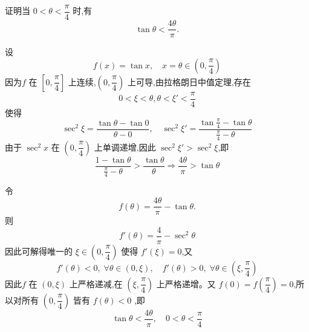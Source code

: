 \begin{questions}
    \question 证明当 $0 < \theta < \dfrac{\pi}{4}$ 时,有
    \[
    \tan \theta < \frac{4\theta}{\pi}.
    \]
    \begin{solution}
        设 
        \[
        f(x) = \tan x,\quad x = \theta \in \left(0, \frac{\pi}{4}\right)
        \]
        因为$f$ 在 $\left[0, \dfrac{\pi}{4}\right]$ 上连续,$\left(0, \dfrac{\pi}{4}\right)$ 上可导,由拉格朗日中值定理,存在
        \[
        0 < \xi < \theta,\theta < \xi' < \frac{\pi}{4}\]
        使得
        \[
        \sec^2 \xi = \frac{\tan \theta - \tan 0}{\theta - 0},\quad \sec^2 \xi' = \frac{\tan\frac{\pi}{4}-\tan \theta}{\frac{\pi}{4}-\theta}
        \]
        由于 $\sec^2 x$ 在 $\left(0, \dfrac{\pi}{4}\right)$ 上单调递增,因此 $\sec^2 \xi' > \sec^2 \xi$,即
        \[
        \frac{1 - \tan \theta}{\frac{\pi}{4} - \theta} > \frac{\tan \theta}{\theta} \Rightarrow \frac{4\theta}{\pi} > \tan \theta
        \]
    \end{solution}
    \begin{solution}
        令
        \[
        f(\theta) = \frac{4\theta}{\pi} - \tan \theta.
        \]
        则
        \[
        f'(\theta) = \frac{4}{\pi} - \sec^2 \theta
        \]
        因此可解得唯一的 $\xi \in \left(0, \dfrac{\pi}{4}\right)$ 使得 $f'(\xi) = 0$,又 
        \[
        f'(\theta) < 0,\; \forall \theta \in (0, \xi),\quad f'(\theta) > 0,\; \forall \theta \in \left(\xi, \frac{\pi}{4}\right)
        \]
        因此$f$ 在 $(0,\xi)$ 上严格递减,在 $\left(\xi, \dfrac{\pi}{4}\right)$ 上严格递增。又 $f(0) = f\left(\dfrac{\pi}{4}\right) = 0$,所以对所有 $\left(0, \dfrac{\pi}{4}\right)$ 皆有 $f(\theta) < 0$ ,即
        \[
        \tan \theta < \frac{4\theta}{\pi}, \quad 0 < \theta < \dfrac{\pi}{4}
        \]
    \end{solution}


\end{questions}
